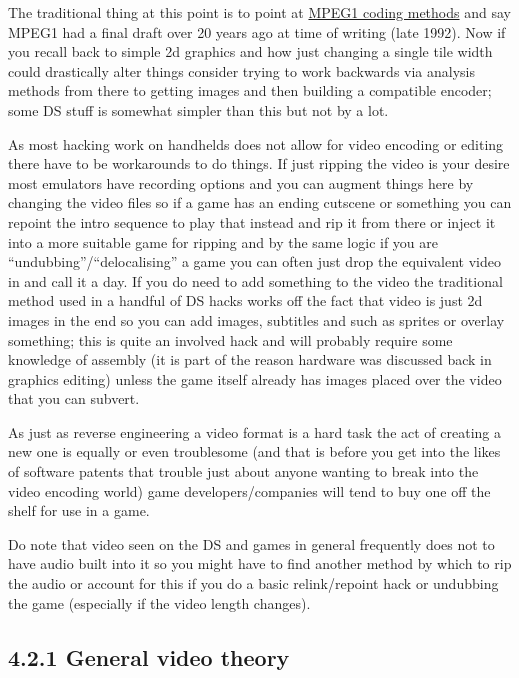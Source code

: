 \documentclass[
]{book}
\begin{document}
The traditional thing at this point is to point at \href{http://www.cmlab.csie.ntu.edu.tw/cml/dsp/training/coding/mpeg1/}{MPEG1 coding methods} and say MPEG1 had a final draft over 20 years ago at time of writing (late 1992). Now if you recall back to simple 2d graphics and how just changing a single tile width could drastically alter things consider trying to work backwards via analysis methods from there to getting images and then building a compatible encoder; some DS stuff is somewhat simpler than this but not by a lot.

As most hacking work on handhelds does not allow for video encoding or editing there have to be workarounds to do things. If just ripping the video is your desire most emulators have recording options and you can augment things here by changing the video files so if a game has an ending cutscene or something you can repoint the intro sequence to play that instead and rip it from there or inject it into a more suitable game for ripping and by the same logic if you are ``undubbing''/``delocalising'' a game you can often just drop the equivalent video in and call it a day. If you do need to add something to the video the traditional method used in a handful of DS hacks works off the fact that video is just 2d images in the end so you can add images, subtitles and such as sprites or overlay something; this is quite an involved hack and will probably require some knowledge of assembly (it is part of the reason hardware was discussed back in graphics editing) unless the game itself already has images placed over the video that you can subvert.

As just as reverse engineering a video format is a hard task the act of creating a new one is equally or even troublesome (and that is before you get into the likes of software patents that trouble just about anyone wanting to break into the video encoding world) game developers/companies will tend to buy one off the shelf for use in a game.

Do note that video seen on the DS and games in general frequently does not to have audio built into it so you might have to find another method by which to rip the audio or account for this if you do a basic relink/repoint hack or undubbing the game (especially if the video length changes).

\hypertarget{general-video-theory}{%
\subsection{4.2.1 General video theory}\label{general-video-theory}}
\end{document}
